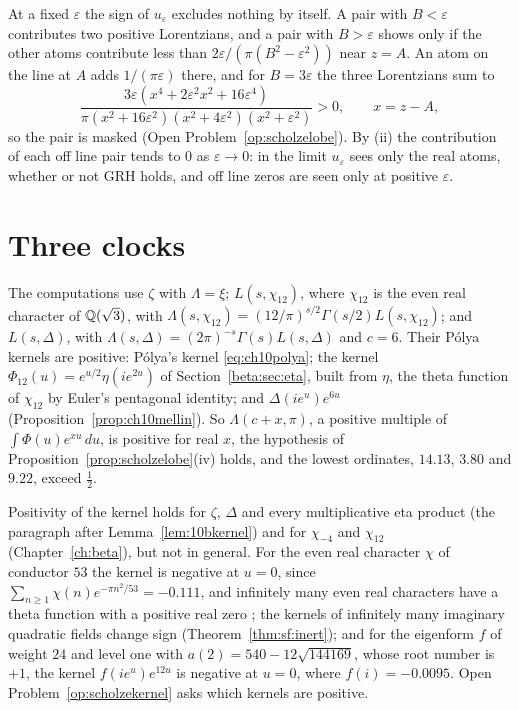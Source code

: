 At a fixed $\varepsilon$ the sign of $u_\varepsilon$ excludes nothing by itself. A pair with $B<\varepsilon$ contributes two positive Lorentzians, and a pair with $B>\varepsilon$ shows only if the other atoms contribute less than $2\varepsilon/(\pi(B^2-\varepsilon^2))$ near $z=A$. An atom on the line at $A$ adds $1/(\pi\varepsilon)$ there, and for $B=3\varepsilon$ the three Lorentzians sum to
\[
\frac{3\varepsilon(x^4+2\varepsilon^2x^2+16\varepsilon^4)}{\pi(x^2+16\varepsilon^2)(x^2+4\varepsilon^2)(x^2+\varepsilon^2)}>0,\qquad x=z-A,
\]
so the pair is masked (Open Problem~\ref{op:scholzelobe}). By (ii) the contribution of each off line pair tends to $0$ as $\varepsilon\to0$: in the limit $u_\varepsilon$ sees only the real atoms, whether or not GRH holds, and off line zeros are seen only at positive $\varepsilon$.

\section{Three clocks}\label{sec:scholzeclocks}

The computations use $\zeta$ with $\Lambda=\xi$; $L(s,\chi_{12})$, where $\chi_{12}$ is the even real character of $\mathbb{Q}(\sqrt3)$, with $\Lambda(s,\chi_{12})=(12/\pi)^{s/2}\Gamma(s/2)L(s,\chi_{12})$; and $L(s,\Delta)$, with $\Lambda(s,\Delta)=(2\pi)^{-s}\Gamma(s)L(s,\Delta)$ and $c=6$. Their P\'olya kernels are positive: P\'olya's kernel \eqref{eq:ch10polya}; the kernel $\Phi_{12}(u)=e^{u/2}\eta(ie^{2u})$ of Section~\ref{beta:sec:eta}, built from $\eta$, the theta function of $\chi_{12}$ by Euler's pentagonal identity; and $\Delta(ie^u)e^{6u}$ (Proposition~\ref{prop:ch10mellin}). So $\Lambda(c+x,\pi)$, a positive multiple of $\int\Phi(u)e^{xu}\,du$, is positive for real $x$, the hypothesis of Proposition~\ref{prop:scholzelobe}(iv) holds, and the lowest ordinates, $14.13$, $3.80$ and $9.22$, exceed $\frac12$.

Positivity of the kernel holds for $\zeta$, $\Delta$ and every multiplicative eta product (the paragraph after Lemma~\ref{lem:10bkernel}) and for $\chi_{-4}$ and $\chi_{12}$ (Chapter~\ref{ch:beta}), but not in general. For the even real character $\chi$ of conductor $53$ the kernel is negative at $u=0$, since $\sum_{n\ge1}\chi(n)e^{-\pi n^2/53}=-0.111$, and infinitely many even real characters have a theta function with a positive real zero \cite{louboutinmunsch2013}; the kernels of infinitely many imaginary quadratic fields change sign (Theorem~\ref{thm:sf:inert}); and for the eigenform $f$ of weight $24$ and level one with $a(2)=540-12\sqrt{144169}$, whose root number is $+1$, the kernel $f(ie^u)e^{12u}$ is negative at $u=0$, where $f(i)=-0.0095$. Open Problem~\ref{op:scholzekernel} asks which kernels are positive.

